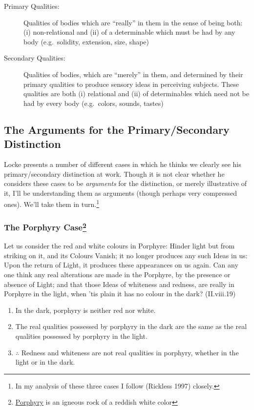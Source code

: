 \documentclass[12pt]{article}
\makeatletter
\newcommand{\citeprocitem}[2]{\hyper@linkstart{cite}{citeproc_bib_item_#1}#2\hyper@linkend}
\makeatother
\begin{document}
\begin{description}
\item[{Primary Qualities:}] Qualities of bodies which are ``really'' in them
in the sense of being both: (i) non-relational and (ii) of a
determinable which must be had by any body (e.g. solidity, extension,
size, shape)
\item[{Secondary Qualities:}] Qualities of bodies, which are ``merely'' in
them, and determined by their primary qualities to produce sensory
ideas in perceiving subjects. These qualities are both (i) relational
and (ii) of determinables which need not be had by every body
(e.g. colors, sounds, tastes)
\end{description}

\subsection{The Arguments for the Primary/Secondary Distinction}
\label{sec:org1efcd66}
Locke presents a number of different cases in which he thinks we clearly
see his primary/secondary distinction at work. Though it is not clear
whether he considers these cases to be \emph{arguments} for the distinction,
or merely illustrative of it, I'll be understanding them as arguments
(though perhaps very compressed ones). We'll take them in turn.\footnote{In my analysis of these three cases I follow (\citeprocitem{6}{Rickless 1997})
closely.}

\subsubsection{The Porphyry Case\footnote{\href{http://en.wikipedia.org/wiki/Porphyry\_(geology)}{Porphyry} is
an igneous rock of a reddish white color}}
\label{sec:orgce5c7e7}
\begin{quote-b}
Let us consider the red and white colours in Porphyre: Hinder light
but from striking on it, and its Colours Vanish; it no longer produces
any such Ideas in us: Upon the return of Light, it produces these
appearances on us again. Can any one think any real alterations are
made in the Porphyre, by the presence or absence of Light; and that
those Ideas of whiteness and redness, are really in Porphyre in the
light, when 'tis plain it has no colour in the dark? (II.viii.19)
\end{quote-b}

\begin{enumerate}
\item In the dark, porphyry is neither red nor white.
\item The real qualities possessed by porphyry in the dark are the same as
the real qualities possessed by porphyry in the light.
\item \(\therefore\) Redness and whiteness are not real qualities in porphyry, whether
in the light or in the dark.
\end{enumerate}
\end{document}
